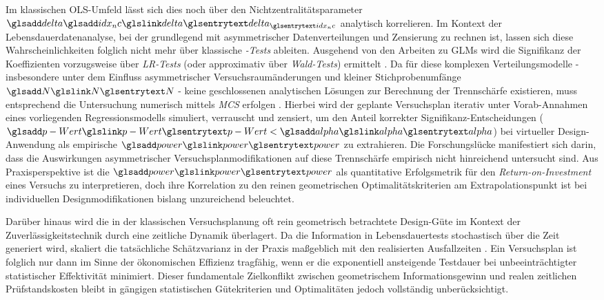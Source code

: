 Im klassischen \ac{OLS}-Umfeld lässt sich dies noch über den Nichtzentralitätsparameter $\symsub{delta}{idx_nc}$ analytisch korrelieren.
Im Kontext der Lebensdauerdatenanalyse, bei der grundlegend mit asymmetrischer Datenverteilungen und Zensierung zu rechnen ist, lassen sich diese Wahrscheinlichkeiten folglich nicht mehr über klassische \textit{-Tests} ableiten.
Ausgehend von den Arbeiten zu \acp{GLM} \cite{Nelder.1972} wird die Signifikanz der Koeffizienten vorzugsweise über \textit{\acp{LR-Test}} (oder approximativ über \textit{Wald-Tests}) ermittelt \cite{Rigdon.2022,Meeker.2022}.
Da für diese komplexen Verteilungsmodelle - insbesondere unter dem Einfluss asymmetrischer Versuchsraumänderungen und kleiner Stichprobenumfänge $\sym{N}$ - keine geschlossenen analytischen Lösungen zur Berechnung der Trennschärfe existieren, muss entsprechend \textcite{Kremer.2021} die Untersuchung numerisch mittels \textit{\ac{MCS}} erfolgen \cite{Arndt.2022}.
Hierbei wird der geplante Versuchsplan iterativ unter Vorab-Annahmen eines vorliegenden Regressionsmodells simuliert, verrauscht und zensiert, um den Anteil korrekter Signifikanz-Entscheidungen ($\sym{p-Wert} < \sym{alpha}$) bei virtueller Design-Anwendung als empirische $\sym{power}$ zu extrahieren.
Die Forschungslücke manifestiert sich darin, dass die Auswirkungen asymmetrischer Versuchsplanmodifikationen auf diese Trennschärfe empirisch nicht hinreichend untersucht sind.
Aus Praxisperspektive ist die $\sym{power}$ als quantitative Erfolgsmetrik für den \textit{Return-on-Investment} eines Versuchs zu interpretieren, doch ihre Korrelation zu den reinen geometrischen Optimalitätskriterien am Extrapolationspunkt ist bei individuellen Designmodifikationen bislang unzureichend beleuchtet.

Darüber hinaus wird die in der klassischen Versuchsplanung oft rein geometrisch betrachtete Design-Güte im Kontext der Zuverlässigkeitstechnik durch eine zeitliche Dynamik überlagert.
Da die Information in Lebensdauertests stochastisch über die Zeit generiert wird, skaliert die tatsächliche Schätzvarianz in der Praxis maßgeblich mit den realisierten Ausfallzeiten \cite{Nelson.2005}.
Ein Versuchsplan ist folglich nur dann im Sinne der ökonomischen Effizienz tragfähig, wenn er die exponentiell ansteigende Testdauer bei unbeeinträchtigter statistischer Effektivität minimiert.
Dieser fundamentale Zielkonflikt zwischen geometrischem Informationsgewinn und realen zeitlichen Prüfstandskosten bleibt in gängigen statistischen Gütekriterien und Optimalitäten jedoch vollständig unberücksichtigt.

